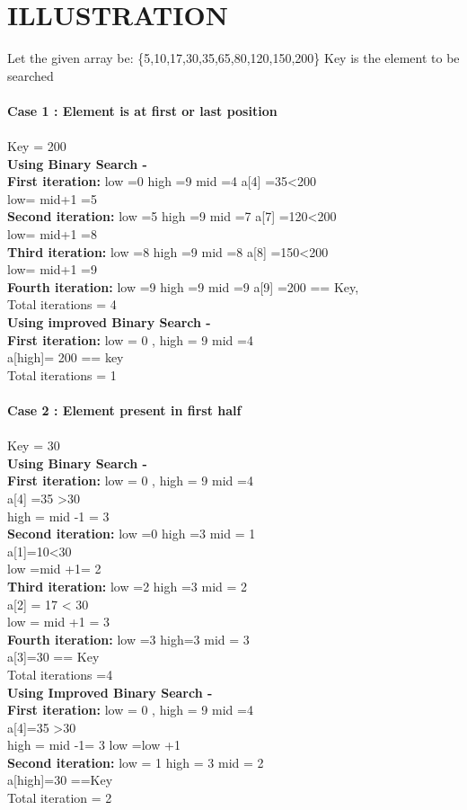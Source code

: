 \documentclass[conference]{IEEEtran}
\begin{document}
\section{ILLUSTRATION}
Let the given array be: \{5,10,17,30,35,65,80,120,150,200\}
Key is the element to be searched\\\\
\textbf{Case 1 : Element is at first or last position}\\\\
    Key = 200\\
\textbf{Using Binary Search -}\\
\textbf{First iteration:} low =0 high =9 mid =4 a[4] =35\textless 200
\\low= mid+1 =5\\
\textbf{Second iteration:} low =5 high =9 mid =7 a[7] =120\textless 200 
\\low= mid+1 =8\\
\textbf{Third iteration:} low =8 high =9 mid =8 a[8] =150\textless 200 
\\low= mid+1 =9\\
\textbf{Fourth iteration:} low =9 high =9 mid =9 a[9] =200 == Key,   
\\Total iterations = 4\\
\textbf{Using improved Binary Search -}\\
\textbf{First iteration:} low = 0 , high = 9 mid =4
\\a[high]= 200  ==  key\\
Total iterations = 1\\\\
\textbf{Case 2 : Element present in first half}\\\\
   Key = 30\\
\textbf{Using Binary Search -}\\
\textbf{First iteration:} low = 0 , high = 9 mid =4\\
a[4] =35 >30 
\\high = mid -1 = 3\\
\textbf{Second iteration:} low =0 high =3 mid = 1
\\a[1]=10<30
\\low =mid +1= 2\\
\textbf{Third iteration:} low =2 high =3 mid = 2
\\a[2] = 17 < 30 
\\low  = mid +1 = 3\\
\textbf{Fourth iteration:} low =3 high=3 mid = 3
\\a[3]=30 == Key
\\Total iterations =4\\
\textbf{Using Improved  Binary Search -}\\
\textbf{First iteration:} low = 0 , high = 9 mid =4
\\a[4]=35 >30 
\\high = mid -1= 3  low =low +1\\
\textbf{Second iteration:} low = 1 high = 3 mid = 2
\\a[high]=30 ==Key
\\Total iteration = 2
\end{document}
